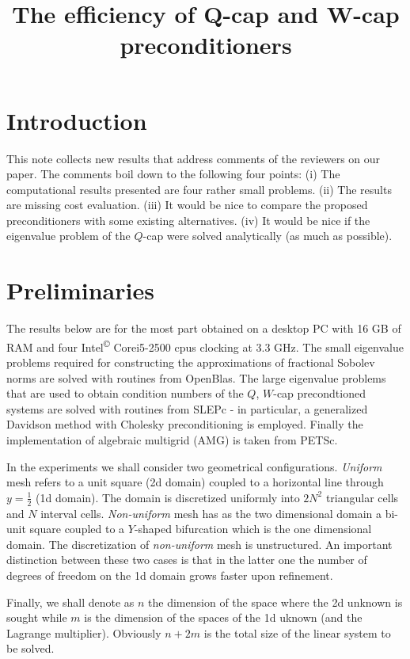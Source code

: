 \documentclass[10pt, a4paper]{article}
\title{The efficiency of Q-cap and W-cap preconditioners}
\begin{document}
\maketitle

\section*{Introduction}
This note collects new results that address comments of the reviewers on our paper. The comments boil down
to the following four points: (i) The computational results presented are four rather small problems.
(ii) The results are missing cost evaluation. (iii) It would be nice to compare the proposed preconditioners
with some existing alternatives. (iv) It would be nice if the eigenvalue problem of the $Q$-cap were solved
analytically (as much as possible).

\section*{Preliminaries}
The results below are for the most part obtained on a desktop PC with 16 GB of RAM and four Intel\textsuperscript{\copyright} 
Core\texttrademark i5-2500 cpus clocking at 3.3 GHz. The small eigenvalue problems required for constructing the approximations
of fractional Sobolev norms are solved with routines from OpenBlas\cite{openblas}. The large eigenvalue problems that are used
to obtain condition numbers of the $Q$, $W$-cap precondtioned systems are solved with routines from SLEPc\cite{slepc} - in particular,
a generalized Davidson method with Cholesky preconditioning is employed. Finally the implementation of algebraic multigrid (AMG) is
taken from PETSc\cite{petsc}.

In the experiments we shall consider two geometrical configurations. \textit{Uniform} mesh refers to a unit square (2d domain) coupled 
to a horizontal line through $y=\tfrac{1}{2}$ (1d domain). The domain is discretized uniformly into $2N^2$ triangular cells and $N$ 
interval cells. \textit{Non-uniform} mesh has as the two dimensional domain a bi-unit square coupled to a $Y$-shaped bifurcation which
is the one dimensional domain. The discretization of \textit{non-uniform} mesh is unstructured. An important distinction between these
two cases is that in the latter one the number of degrees of freedom on the 1d domain grows faster upon refinement. 

Finally, we shall denote as $n$ the dimension of the space where the 2d unknown is sought while $m$ is the dimension of the spaces of
the 1d uknown (and the Lagrange multiplier). Obviously $n+2m$ is the total size of the linear system to be solved.
\end{document}
